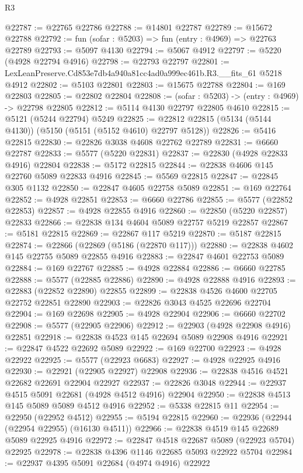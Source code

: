 \begin{lexlean}{R3}
\begin{coremodule}
@22787 := @22765 @22786
@22788 := @14801 @22787
@22789 := @15672 @22788
@22792 := fun (sofar : @5203) => fun (entry : @4969) => @22763 @22789
@22793 := @5097 @4130
@22794 := @5067 @4912
@22797 := @5220 (@4928 @22794 @4916)
@22798 := @22793 @22797
@22801 := LexLeanPreserve.Cd853e7db4a940a81cc4ad0a999ec461b.R3.__fits_61 @5218 @4912
@22802 := @5103 @22801
@22803 := @15675 @22788
@22804 := @169 @22803
@22805 := @22802 @22804
@22808 := (sofar : @5203) -> (entry : @4969) -> @22798 @22805
@22812 := @5114 @4130 @22797 @22805 @4610
@22815 := @5121 (@5244 @22794) @5249
@22825 := @22812 @22815 (@5134 (@5144 @4130)) (@5150 (@5151 (@5152 @4610) @22797 @5128))
@22826 := @5416 @22815
@22830 := @22826 @3038 @4608 @22762 @22789
@22831 := @6660 @22787
@22833 := @5577 (@5220 @22831)
@22837 := @22830 (@4928 @22833 @4916) @22804
@22838 := @5172 @22815
@22844 := @22838 @4606 @145 @22760 @5089 @22833 @4916
@22845 := @5569 @22815
@22847 := @22845 @305 @1132
@22850 := @22847 @4605 @22758 @5089
@22851 := @169 @22764
@22852 := @4928 @22851
@22853 := @6660 @22786
@22855 := @5577 (@22852 @22853)
@22857 := @4928 @22855 @4916
@22860 := @22850 (@5220 @22857) @22833
@22866 := @22838 @134 @4604 @5089 @22757 @5219 @22857
@22867 := @5181 @22815
@22869 := @22867 @117 @5219
@22870 := @5187 @22815
@22874 := @22866 (@22869 (@5186 (@22870 @117)))
@22880 := @22838 @4602 @145 @22755 @5089 @22855 @4916
@22883 := @22847 @4601 @22753 @5089
@22884 := @169 @22767
@22885 := @4928 @22884
@22886 := @6660 @22785
@22888 := @5577 (@22885 @22886)
@22890 := @4928 @22888 @4916
@22893 := @22883 (@22852 @22890) @22855
@22899 := @22838 @4526 @4600 @22705 @22752 @22851 @22890
@22903 := @22826 @3043 @4525 @22696 @22704
@22904 := @169 @22698
@22905 := @4928 @22904
@22906 := @6660 @22702
@22908 := @5577 (@22905 @22906)
@22912 := @22903 (@4928 @22908 @4916) @22851
@22918 := @22838 @4523 @145 @22694 @5089 @22908 @4916
@22921 := @22847 @4522 @22692 @5089
@22922 := @169 @22700
@22923 := @4928 @22922
@22925 := @5577 (@22923 @6683)
@22927 := @4928 @22925 @4916
@22930 := @22921 (@22905 @22927) @22908
@22936 := @22838 @4516 @4521 @22682 @22691 @22904 @22927
@22937 := @22826 @3048
@22944 := @22937 @4515 @5091 @22681 (@4928 @4512 @4916) @22904
@22950 := @22838 @4513 @145 @5089 @5089 @4512 @4916
@22952 := @5338 @22815 @11
@22954 := @22950 (@22952 @4512)
@22955 := @5194 @22815
@22960 := @22936 (@22944 (@22954 @22955) (@16130 @4511))
@22966 := @22838 @4519 @145 @22689 @5089 @22925 @4916
@22972 := @22847 @4518 @22687 @5089 (@22923 @5704) @22925
@22978 := @22838 @4396 @1146 @22685 @5093 @22922 @5704
@22984 := @22937 @4395 @5091 @22684 (@4974 @4916) @22922

\end{coremodule}
\end{lexlean}
